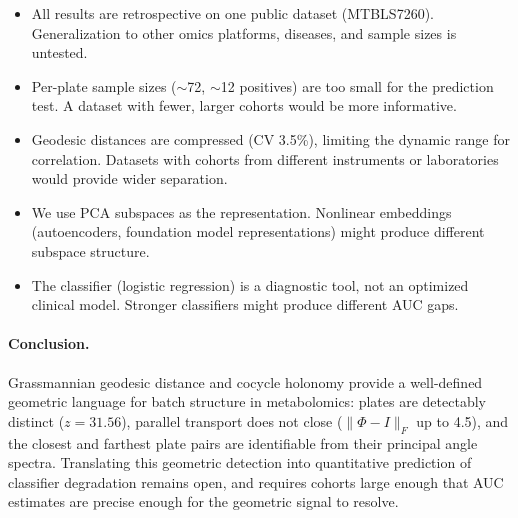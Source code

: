 \documentclass{article}
\begin{document}
\begin{itemize}
\item All results are retrospective on one public dataset (MTBLS7260). Generalization to other omics platforms, diseases, and sample sizes is untested.
\item Per-plate sample sizes ($\sim$72, $\sim$12 positives) are too small for the prediction test. A dataset with fewer, larger cohorts would be more informative.
\item Geodesic distances are compressed (CV 3.5\%), limiting the dynamic range for correlation. Datasets with cohorts from different instruments or laboratories would provide wider separation.
\item We use PCA subspaces as the representation. Nonlinear embeddings (autoencoders, foundation model representations) might produce different subspace structure.
\item The classifier (logistic regression) is a diagnostic tool, not an optimized clinical model. Stronger classifiers might produce different AUC gaps.
\end{itemize}

\paragraph{Conclusion.} Grassmannian geodesic distance and cocycle holonomy provide a well-defined geometric language for batch structure in metabolomics: plates are detectably distinct ($z = 31.56$), parallel transport does not close ($\|\Phi - I\|_F$ up to 4.5), and the closest and farthest plate pairs are identifiable from their principal angle spectra. Translating this geometric detection into quantitative prediction of classifier degradation remains open, and requires cohorts large enough that AUC estimates are precise enough for the geometric signal to resolve.



\end{document}

